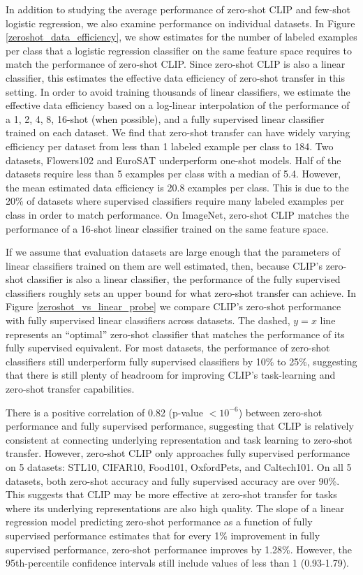 In addition to studying the average performance of zero-shot CLIP and few-shot logistic regression, we also examine performance on individual datasets. In Figure \ref{zeroshot_data_efficiency}, we show estimates for the number of labeled examples per class that a logistic regression classifier on the same feature space requires to match the performance of zero-shot CLIP. Since zero-shot CLIP is also a linear classifier, this estimates the effective data efficiency of zero-shot transfer in this setting. In order to avoid training thousands of linear classifiers, we estimate the effective data efficiency based on a log-linear interpolation of the performance of a 1, 2, 4, 8, 16-shot (when possible), and a fully supervised linear classifier trained on each dataset. We find that zero-shot transfer can have widely varying efficiency per dataset from less than 1 labeled example per class to 184. Two datasets, Flowers102 and EuroSAT underperform one-shot models. Half of the datasets require less than 5 examples per class with a median of 5.4. However, the mean estimated data efficiency is 20.8 examples per class. This is due to the 20\% of datasets where supervised classifiers require many labeled examples per class in order to match performance. On ImageNet, zero-shot CLIP matches the performance of a 16-shot linear classifier trained on the same feature space. 

If we assume that evaluation datasets are large enough that the parameters of linear classifiers trained on them are well estimated, then, because CLIP's zero-shot classifier is also a linear classifier, the performance of the fully supervised classifiers roughly sets an upper bound for what zero-shot transfer can achieve. In Figure \ref{zeroshot_vs_linear_probe} we compare CLIP's zero-shot performance with fully supervised linear classifiers across datasets. The dashed, $y=x$ line represents an ``optimal'' zero-shot classifier that matches the performance of its fully supervised equivalent. For most datasets, the performance of zero-shot classifiers still underperform fully supervised classifiers by 10\% to 25\%, suggesting that there is still plenty of headroom for improving CLIP's task-learning and zero-shot transfer capabilities.

There is a positive correlation of 0.82 (p-value $<10^{-6}$) between zero-shot performance and fully supervised performance, suggesting that CLIP is relatively consistent at connecting underlying representation and task learning to zero-shot transfer. However, zero-shot CLIP only approaches fully supervised performance on 5 datasets: STL10, CIFAR10, Food101, OxfordPets, and Caltech101. On all 5 datasets, both zero-shot accuracy and fully supervised accuracy are over 90\%. This suggests that CLIP may be more effective at zero-shot transfer for tasks where its underlying representations are also high quality. The slope of a linear regression model predicting zero-shot performance as a function of fully supervised performance estimates that for every 1\% improvement in fully supervised performance, zero-shot performance improves by 1.28\%. However, the 95th-percentile confidence intervals still include values of less than 1 (0.93-1.79).

